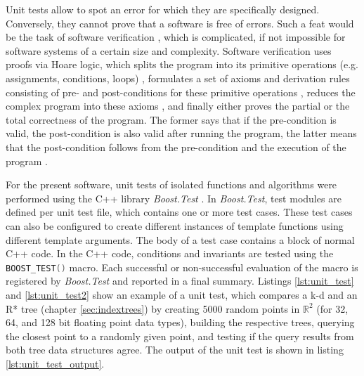 Unit tests allow to spot an error for which they are specifically designed. Conversely, they cannot 
prove that a software is free of errors. Such a feat would be the task of software
verification \cite[Ch. 5, pp. 117-144]{Berghammer2017}, which is complicated, if not impossible for
software systems of a certain size and complexity.
Software verification uses proofs via Hoare logic, which splits the program into its primitive
operations (e.g. assignments, conditions, loops) \cite[pp. 118-119]{Berghammer2017}, formulates
a set of axioms and derivation rules consisting of pre- and post-conditions for these primitive operations
\cite[pp. 122]{Berghammer2017}, reduces the complex program into these axioms \cite[pp. 123]{Berghammer2017},
and finally either proves the partial or the total correctness of the program.
The former says that if the pre-condition is valid, the post-condition is also valid after running the
program, the latter means that the post-condition follows from the pre-condition and the execution
of the program \cite[pp. 121]{Berghammer2017}.

For the present software, unit tests of isolated functions and algorithms were performed using the 
C++ library \textit{Boost.Test} \cite{web_boost_test}.
In \textit{Boost.Test}, test modules are defined per unit test file, which contains one or more test cases.
These test cases can also be configured to create different instances of template functions using
different template arguments. The body of a test case contains a block of normal C++ code.
In the C++ code, conditions and invariants are tested using the 
\lstinline[language=C++]|BOOST_TEST()| macro. Each successful or non-successful evaluation
of the macro is registered by \textit{Boost.Test} and reported in a final summary.
Listings \ref{lst:unit_test} and \ref{lst:unit_test2} show an example of a unit test, which compares
a k-d and an R* tree (chapter \ref{sec:indextrees}) by creating 5000 random points in $\mathbb{R}^2$
(for 32, 64, and 128 bit floating point data types), 
building the respective trees, querying the closest point to a randomly given point, 
and testing if the query results from both tree data structures agree. 
The output of the unit test is shown in listing \ref{lst:unit_test_output}.

